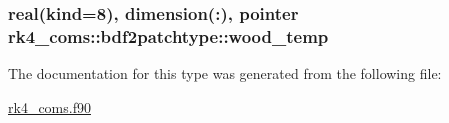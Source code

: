 \subsubsection[{wood\+\_\+temp}]{\setlength{\rightskip}{0pt plus 5cm}real(kind=8), dimension(\+:), pointer rk4\+\_\+coms\+::bdf2patchtype\+::wood\+\_\+temp}\label{structrk4__coms_1_1bdf2patchtype_a760e813763073c0ebbcc9768d2d85b92}


The documentation for this type was generated from the following file\+:\begin{DoxyCompactItemize}
\item 
\hyperlink{rk4__coms_8f90}{rk4\+\_\+coms.\+f90}\end{DoxyCompactItemize}
